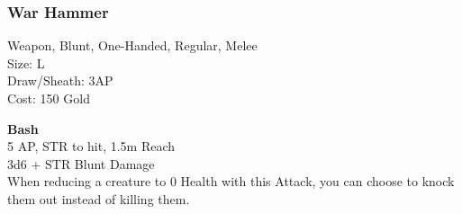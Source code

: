 \subsubsection{War Hammer}\label{weapon:warHammer}
Weapon, Blunt, One-Handed, Regular, Melee\\
Size: L\\
Draw/Sheath: 3AP\\
Cost: 150 Gold

\textbf{Bash}\\
5 AP, STR to hit, 1.5m Reach\\
3d6 + \texttimes STR Blunt Damage\\
When reducing a creature to 0 Health with this Attack, you can choose to knock them out instead of killing them.